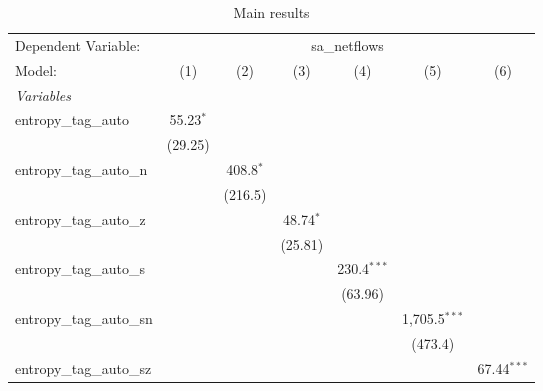 
\begin{table}[htbp]
   \centering
   \footnotesize
   \begin{threeparttable}[b]
      \caption{\label{tab:reg_sa_netflows_tag_auto.tex} Main results}
      \begin{tabular}{lcccccc}
         \tabularnewline \midrule \midrule
         Dependent Variable: & \multicolumn{6}{c}{sa\_netflows}\\
         Model:                    & (1)            & (2)            & (3)            & (4)            & (5)             & (6)\\  
         \midrule
         \emph{Variables}\\
         entropy\_tag\_auto        & 55.23$^{*}$    &                &                &                &                 &   \\   
                                   & (29.25)        &                &                &                &                 &   \\   
         entropy\_tag\_auto\_n     &                & 408.8$^{*}$    &                &                &                 &   \\   
                                   &                & (216.5)        &                &                &                 &   \\   
         entropy\_tag\_auto\_z     &                &                & 48.74$^{*}$    &                &                 &   \\   
                                   &                &                & (25.81)        &                &                 &   \\   
         entropy\_tag\_auto\_s     &                &                &                & 230.4$^{***}$  &                 &   \\   
                                   &                &                &                & (63.96)        &                 &   \\   
         entropy\_tag\_auto\_sn    &                &                &                &                & 1,705.5$^{***}$ &   \\   
                                   &                &                &                &                & (473.4)         &   \\   
         entropy\_tag\_auto\_sz    &                &                &                &                &                 & 67.44$^{***}$\\   

\end{tabular}
\end{threeparttable}
\end{table}
